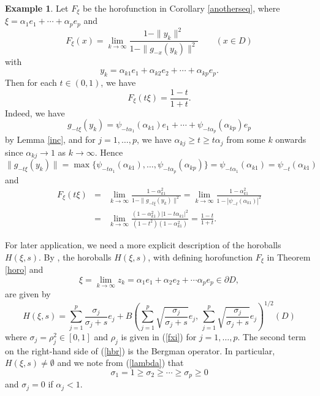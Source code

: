 \documentclass[12pt, twoside]{article}
\theoremstyle{definition}
\newtheorem{example}[theorem]{Example}
\numberwithin{equation}{section}
\begin{document}
\begin{example}\label{xilambda} Let $F_\xi$ be the horofunction in Corollary \ref{anotherseq}, where
$\xi = \alpha_1e_1+ \cdots +\alpha_p e_{p}$ and
$$F_\xi (x) = \lim_{k\rightarrow \infty} \frac{1-\|y_k\|^2}{1-\|g_{-x}(y_k)\|^2}\qquad (x\in D)$$
with
$$y_k = \alpha_{k1}e_1 + \alpha_{k2}e_2 + \cdots + \alpha_{kp}e_{p}.$$
Then for each $t \in (0,1)$, we have
$$F_\xi(t \xi) = \frac{1-t}{1+t}.$$
Indeed, we have
$$g_{-t \xi}(y_k) =\psi_{-t\alpha_1}(\alpha_{k1}) e_1 + \cdots + \psi_{-t\alpha_p}(\alpha_{kp}) e_p$$
by Lemma \ref{inc}, and for $j=1, \ldots, p$, we have $\alpha_{kj} \geq t\geq t\alpha_j$ from some $k$ onwards
since $\alpha_{kj} \rightarrow 1$ as $k \rightarrow \infty$. Hence
$$\|g_{-t \xi}(y_k)\| = \max \{\psi_{-t\alpha_1}(\alpha_{k1}), \ldots,  \psi_{-t\alpha_p}(\alpha_{kp})\}
=\psi_{-t\alpha_1}(\alpha_{k1})= \psi_{-t}(\alpha_{k1})$$ and
\begin{eqnarray*}
 F_\xi({t \xi}) &=&\lim_{k\rightarrow\infty} \frac{1- \alpha_{k1}^2}{1-\|g_{-t \xi}(y_k)\|^2}
=  \lim_{k\rightarrow\infty} \frac{1- \alpha_{k1}^2}{1- |\psi_{-t}(\alpha_{k1})|^2}\\
&=& \lim_{ k \rightarrow \infty} \frac{(1- \alpha_{k1}^2)|1-t \alpha_{ k1}|^2}
{(1-t^2)(1-\alpha_{ k1}^2)}=\frac{1-t}{1+t}.
\end{eqnarray*}
\end{example}

For later application, we need a more explicit description of the horoballs $H(\xi,s)$.
 By \cite[Theorem 5.11]{horo}, the horoballs $H(\xi,s)$,
with defining horofunction $F_\xi$  in Theorem \ref{horo} and
\begin{equation}\label{47}
\xi = \lim_{k\rightarrow\infty} z_k = \alpha_1 e_1 + \alpha_2 e_2 + \cdots \alpha_p e_p \in \partial D,
\end{equation}
 are given by
\begin{equation}\label{hbr}
H(\xi, s)= \sum_{j=1}^p \frac{\sigma_j}{\sigma_j+s} e_j +
B\left (\sum_{j=1}^p \sqrt{\frac{\sigma_j}{\sigma_j+s}} e_j, \,\sum_{j=1}^p \sqrt{\frac{\sigma_j}{\sigma_j +s}} e_j
\right)^{1/2}(D)
\end{equation}
where $\sigma_j =\rho_j^2\in [0,1]$ \cite[(5.6)]{cr} and $\rho_j$ is given in (\ref{fxi})
for $j=1, \ldots,p$.
The second term on the right-hand side of (\ref{hbr}) is the Bergman operator.
In particular, $H(\xi,s) \neq \emptyset$ and
we note from (\ref{lambda}) that
$$\sigma_1 =1 \geq \sigma_2 \geq \cdots \geq \sigma_p\geq 0$$
and $\sigma_j=0$ if $\alpha_j <1$.
\end{document}
